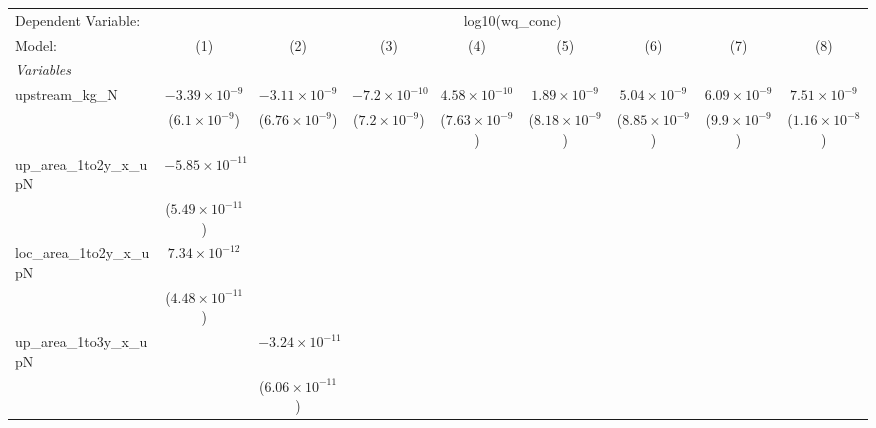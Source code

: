 
\begingroup
\centering
\begin{tabular}{lcccccccc}
   \tabularnewline \midrule \midrule
   Dependent Variable: & \multicolumn{8}{c}{log10(wq\_conc)}\\
   Model:                       & (1)                      & (2)                      & (3)                      & (4)                      & (5)                      & (6)                      & (7)                      & (8)\\  
   \midrule
   \emph{Variables}\\
   upstream\_kg\_N              & $-3.39\times 10^{-9}$    & $-3.11\times 10^{-9}$    & $-7.2\times 10^{-10}$    & $4.58\times 10^{-10}$    & $1.89\times 10^{-9}$     & $5.04\times 10^{-9}$     & $6.09\times 10^{-9}$     & $7.51\times 10^{-9}$\\    
                                & ($6.1\times 10^{-9}$)    & ($6.76\times 10^{-9}$)   & ($7.2\times 10^{-9}$)    & ($7.63\times 10^{-9}$)   & ($8.18\times 10^{-9}$)   & ($8.85\times 10^{-9}$)   & ($9.9\times 10^{-9}$)    & ($1.16\times 10^{-8}$)\\    
   up\_area\_1to2y\_x\_upN      & $-5.85\times 10^{-11}$   &                          &                          &                          &                          &                          &                          &   \\   
                                & ($5.49\times 10^{-11}$)  &                          &                          &                          &                          &                          &                          &   \\   
   loc\_area\_1to2y\_x\_upN     & $7.34\times 10^{-12}$    &                          &                          &                          &                          &                          &                          &   \\   
                                & ($4.48\times 10^{-11}$)  &                          &                          &                          &                          &                          &                          &   \\   
   up\_area\_1to3y\_x\_upN      &                          & $-3.24\times 10^{-11}$   &                          &                          &                          &                          &                          &   \\   
                                &                          & ($6.06\times 10^{-11}$)  &                          &                          &                          &                          &                          &   \\   

\end{tabular}

